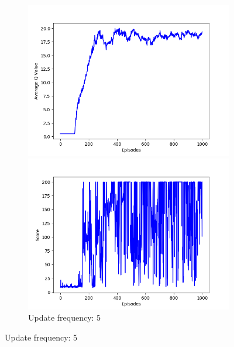 \documentclass{article}
\begin{document}
\begin{figure}[!htbp]
  \begin{subfigure}{\textwidth}
    \begin{minipage}{0.5\textwidth}
      \centering
      \includegraphics[scale=0.45]{../experiments/update_fq_5/qvalues.png}
    \end{minipage}
    \begin{minipage}{0.5\textwidth}
      \centering
      \includegraphics[scale=0.45]{../experiments/update_fq_5/scores.png}
    \end{minipage}
    \caption{Update frequency: 5}
  \end{subfigure}%


\end{figure}
\end{document}
